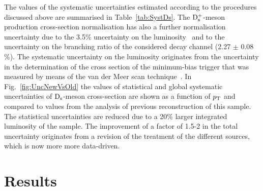 The values of the systematic uncertainties estimated according to the procedures 
discussed above are summarised
in Table~\ref{tab:SystDs}. 
The ${\rm D_s^+}$-meson production 
cross-section normalisation has also a further normalisation uncertainty
due to the 3.5\% uncertainty on the luminosity~\cite{Abelev:2012sea} 
and to the uncertainty on the branching ratio 
of the considered decay channel (2.27 $\pm$ 0.08 \%). The systematic uncertainty 
on the luminosity originates from the uncertainty 
in the determination of the cross section of the minimum-bias trigger 
that was measured by means of the van der Meer scan technique~\cite{vanderMeer:296752}.
In Fig.~\ref{fig:UncNewVsOld} the values of statistical and global
systematic uncertainties of ${\rm D_s}$-meson cross-section are shown as a function of $p_{\rm T}$ and compared to values from 
the analysis of previous reconstruction of this sample. 
The statistical uncertainties are reduced due to a 20\% larger integrated 
luminosity of the sample. The improvement of a factor of 1.5-2 in the total uncertainty  
originates from a revision of the treatment of the different sources, which is now
more more data-driven.


\section{Results}
\label{sec:resultsPP}
